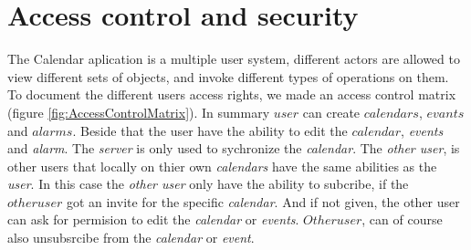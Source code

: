\section{Access control and security}

The Calendar aplication is a multiple user system, different actors are allowed to view different sets of objects, and invoke different types of operations on them. To document the different users access rights, we made an access control matrix (figure \ref{fig:AccessControlMatrix}). 
In summary \(user\) can create \(calendars\), \(evants\) and \(alarms\). Beside that the user have the ability to edit the \(calendar\), \textit{events} and \textit{alarm}. The \textit{server} is only used to sychronize the \textit{calendar}. The \textit{other user}, is other users that locally on thier own \textit{calendars} have the same abilities as the \textit{user}. In this case the \textit{other user} only have the ability to subcribe, if the \(other user\) got an invite for the specific \textit{calendar}. And if not given, the other user can ask for permision to edit the \textit{calendar} or \textit{events}. \(Other user\), can of course also unsubsrcibe from the \textit{calendar} or \textit{event}.
\newline

